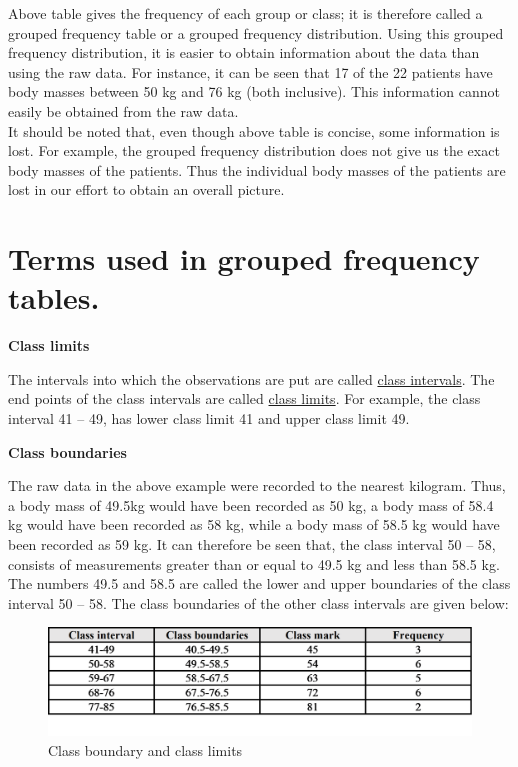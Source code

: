 \documentclass[
]{book}
\begin{document}
Above table gives the frequency of each group or class; it is therefore called a grouped frequency table or a grouped frequency distribution. Using this grouped frequency distribution, it is easier to obtain information about the data than using the raw data. For instance, it can be seen that 17 of the 22 patients have body masses between 50 kg and 76 kg (both inclusive). This information cannot easily be obtained from the raw data.\\
It should be noted that, even though above table is concise, some information is lost. For example, the grouped frequency distribution does not give us the exact body masses of the patients. Thus the individual body masses of the patients are lost in our effort to obtain an overall picture.

\hypertarget{terms-used-in-grouped-frequency-tables.}{%
\section{Terms used in grouped frequency tables.}\label{terms-used-in-grouped-frequency-tables.}}

\textbf{Class limits}

The intervals into which the observations are put are called \underline{class intervals}. The end points of the class intervals are called \underline{class limits}. For example, the class interval 41 -- 49, has lower class limit 41 and upper class limit 49.

\textbf{Class boundaries}

The raw data in the above example were recorded to the nearest kilogram. Thus, a body mass of 49.5kg would have been recorded as 50 kg, a body mass of 58.4 kg would have been recorded as 58 kg, while a body mass of 58.5 kg would have been recorded as 59 kg. It can therefore be seen
that, the class interval 50 -- 58, consists of measurements greater than or equal to 49.5 kg and less than 58.5 kg. The numbers 49.5 and 58.5 are called the lower and upper boundaries of the class interval 50 -- 58. The class boundaries of the other class intervals are given below:

\begin{figure}

{\centering \includegraphics[width=0.7\linewidth]{images/image7} 

}

\caption{Class boundary and class limits}\label{fig:clsslmt}
\end{figure}
\end{document}
